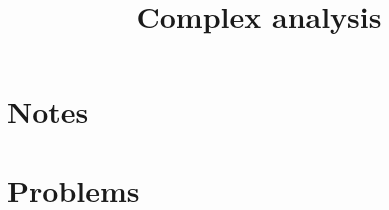





\title{Complex analysis}


\author{}

\maketitle

\setcounter{tocdepth}{1}
\tableofcontents

\part{Notes}

\part{Problems}

